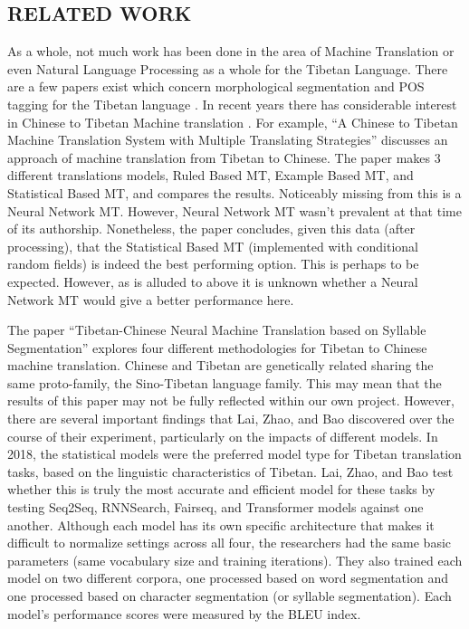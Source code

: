 \documentclass[letterpaper, 12 pt, conference]{ieeeconf}  %
\begin{document}
\subsection{RELATED WORK}

As a whole, not much work has been done in the area of Machine Translation or even Natural Language Processing as a whole for the Tibetan Language. There are a few papers exist which concern morphological segmentation and POS tagging for the Tibetan language \cite{c3} \cite{c4}. In recent years there has considerable interest in Chinese to Tibetan Machine translation \cite{c1} \cite{c2}. For example, “A Chinese to Tibetan Machine Translation System with Multiple Translating Strategies” discusses an approach of machine translation from Tibetan to Chinese. The paper makes 3 different translations models, Ruled Based MT, Example Based MT, and Statistical Based MT,  and compares the results. Noticeably missing from this is a Neural Network MT. However, Neural Network MT wasn’t prevalent at that time of its authorship. Nonetheless, the paper concludes, given this data (after processing), that the Statistical Based MT (implemented with conditional random fields) is indeed the best performing option. This is perhaps to be expected. However, as is alluded to above it is unknown whether a Neural Network MT would give a better performance here.

The paper “Tibetan-Chinese Neural Machine Translation based on Syllable Segmentation” explores four different methodologies for Tibetan to Chinese machine translation. Chinese and Tibetan are genetically related sharing the same proto-family, the Sino-Tibetan language family. This may mean that the results of this paper may not be fully reflected within our own project. However, there are several important findings that Lai, Zhao, and Bao discovered over the course of their experiment, particularly on the impacts of different models. In 2018, the statistical models were the preferred model type for Tibetan translation tasks, based on the linguistic characteristics of Tibetan. Lai, Zhao, and Bao test whether this is truly the most accurate and efficient model for these tasks by testing Seq2Seq, RNNSearch, Fairseq, and Transformer models against one another. Although each model has its own specific architecture that makes it difficult to normalize settings across all four, the researchers had the same basic parameters (same vocabulary size and training iterations). They also trained each model on two different corpora, one processed based on word segmentation and one processed based on character segmentation (or syllable segmentation). Each model’s performance scores were measured by the BLEU index.
\end{document}
